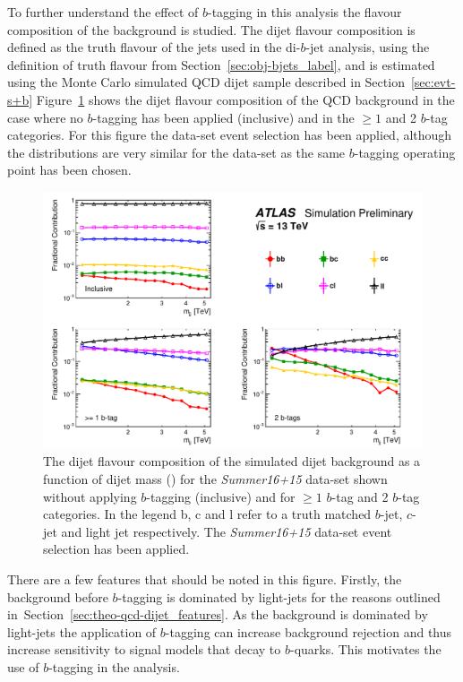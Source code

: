 To further understand the effect of $b$-tagging in this analysis the flavour composition of the background is studied.
The dijet flavour composition is defined as the truth flavour of the jets used in the di-$b$-jet analysis,
using the definition of truth flavour from Section~\ref{sec:obj-bjets_label},
and is estimated using the Monte Carlo simulated QCD dijet sample described in Section~\ref{sec:evt-s+b}
Figure~\ref{fig:evt-summer_flavcomp} shows the dijet flavour composition of the QCD background in
the case where no $b$-tagging has been applied (inclusive) and in the $\geq1$ and 2 $b$-tag categories.
For this figure the \summer{} data-set event selection has been applied,
although the distributions are very similar for the \hm{} data-set
as the same $b$-tagging operating point has been chosen.

\begin{figure}[!ht]
  \begin{center}
    \includegraphics[width=0.99\linewidth, angle=0]{figs/Dibjet/ICHEP/evt-summer_flavcomp.pdf}
  \end{center}
  \caption{The dijet flavour composition of the simulated dijet background as a function of dijet mass (\mjj{}) for the \textit{Summer16+15} data-set
    shown without applying $b$-tagging (inclusive) and for $\geq1$ $b$-tag and 2 $b$-tag categories.
    In the legend b, c and l refer to a truth matched $b$-jet, $c$-jet and light jet respectively.
    The \textit{Summer16+15} data-set event selection has been applied.}
  \label{fig:evt-summer_flavcomp}
\end{figure}

There are a few features that should be noted in this figure.
Firstly, the background before $b$-tagging is dominated by light-jets
for the reasons outlined in~Section~\ref{sec:theo-qcd-dijet_features}.
As the background is dominated by light-jets the application
of $b$-tagging can increase background rejection
and thus increase sensitivity to signal models that decay to $b$-quarks.
This motivates the use of $b$-tagging in the analysis.

